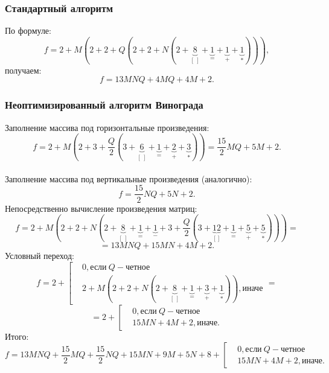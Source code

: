 \documentclass[a4paper,12pt]{article}
\begin{document}
		\subsubsection{Стандартный алгоритм}
		По формуле:
		\[
			f = 2 + M(2 + 2 + Q(2 + 2 + N(2 + \underbrace{8}_{[\:]} + \underbrace{1}_{=} + \underbrace{1}_{+} + \underbrace{1}_{*}))),		
		\]
		получаем:
		\[
		f = 13MNQ + 4MQ + 4M + 2.
		\]
		
		\subsubsection{Неоптимизированный алгоритм Винограда}
		Заполнение массива под горизонтальные произведения:
		\[
			f = 2 + M(2 + 3 + \frac{Q}{2}(3 + \underbrace{6}_{[\:]} + \underbrace{1}_{=} + \underbrace{2}_{+} + \underbrace{3}_{*})) = \frac{15}{2}MQ + 5M + 2.		
		\]
		\\
		Заполнение массива под вертикальные произведения (аналогично):
		\[
			f = \frac{15}{2}NQ + 5N + 2.		
		\]
		Непосредственно вычисление произведения матриц:
		\[
		f = 2 + M(2 + 2 + N(2 + \underbrace{8}_{[\:]} + \underbrace{1}_{=} + \underbrace{1}_{-}  + 3 + \frac{Q}{2}(3 + \underbrace{12}_{[]} + \underbrace{1}_{=} + \underbrace{5}_{+} + \underbrace{5}_{*}))) = 
		\]
		\[
		 = 13MNQ + 15MN + 4M + 2.
		\]
		Условный переход:
		\[
		f = 2 + \left [
		\begin{aligned}
		&0,  \text{если}\: Q - \text{четное} \\
		&2 + M(2 + 2 + N(2 + \underbrace{8}_{[\:]} + \underbrace{1}_{=} + \underbrace{3}_{+} + \underbrace{1}_{*})), \text{иначе}
		\end{aligned}
		\right. = \]
		\[ = 2 + \left [
		\begin{aligned}
		&0,  \text{если}\: Q - \text{четное} \\
		&15MN + 4M + 2, \text{иначе}.
		\end{aligned}
		\right. 
		\]
		Итого:
		\[
			f = 13MNQ + \frac{15}{2}MQ + \frac{15}{2}NQ + 15MN + 9M + 5N + 8 + \left [ \begin{aligned}
		&0, \text{если}\: Q - \text{четное} \\
		&15MN + 4M + 2, \text{иначе}.
		\end{aligned}
		\right.
		\]
		
		
\end{document}
